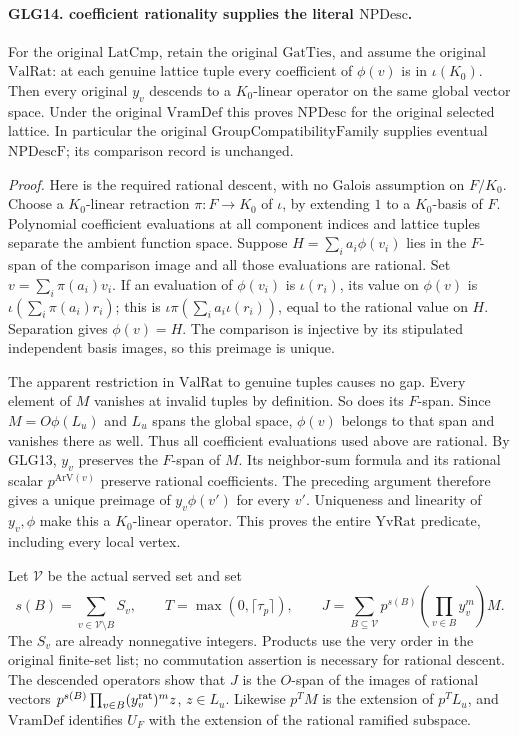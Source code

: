 \paragraph{GLG14. coefficient rationality supplies the literal \(\mathrm{NPDesc}\).}
\label{claim:GLG14}
For the original \(\mathrm{LatCmp}\), retain the original
\(\mathrm{GatTies}\), and assume the original
\(\mathrm{ValRat}\): at each genuine lattice tuple every
coefficient of \(\phi(v)\) is in \(\iota(K_0)\).
Then every original \(y_v\) descends to a \(K_0\)-linear
operator on the same global vector space. Under the
original \(\mathrm{VramDef}\) this proves
\(\mathrm{NPDesc}\) for the original selected lattice.
In particular the original
\(\mathrm{GroupCompatibilityFamily}\) supplies eventual
\(\mathrm{NPDescF}\); its comparison record is unchanged.

\emph{Proof.}
Here is the required rational descent, with no Galois
assumption on \(F/K_0\). Choose a \(K_0\)-linear retraction
\(\pi:F\to K_0\) of \(\iota\), by extending \(1\) to a
\(K_0\)-basis of \(F\). Polynomial coefficient evaluations
at all component indices and lattice tuples separate
the ambient function space. Suppose
\(H=\sum_i a_i\phi(v_i)\) lies in the \(F\)-span of the
comparison image and all those evaluations are rational.
Set \(v=\sum_i\pi(a_i)v_i\). If an evaluation of
\(\phi(v_i)\) is \(\iota(r_i)\), its value on \(\phi(v)\)
is \(\iota(\sum_i\pi(a_i)r_i)\); this is
\(\iota\pi(\sum_i a_i\iota(r_i))\), equal to the
rational value on \(H\). Separation gives \(\phi(v)=H\).
The comparison is injective by its stipulated independent
basis images, so this preimage is unique.

The apparent restriction in \(\mathrm{ValRat}\) to genuine
tuples causes no gap. Every element of \(M\) vanishes
at invalid tuples by definition. So does its \(F\)-span.
Since \(M=O\phi(L_u)\) and \(L_u\) spans the global space,
\(\phi(v)\) belongs to that span and vanishes there as well.
Thus all coefficient evaluations used above are rational.
By GLG13, \(y_v\) preserves the \(F\)-span of \(M\).
Its neighbor-sum formula and its rational scalar
\(p^{\mathrm{ArV}(v)}\) preserve rational coefficients.
The preceding argument therefore gives a unique preimage
of \(y_v\phi(v')\) for every \(v'\). Uniqueness and
linearity of \(y_v,\phi\) make this a \(K_0\)-linear
operator. This proves the entire \(\mathrm{YvRat}\)
predicate, including every local vertex.

Let \(\mathcal V\) be the actual served set and set
\[
 s(B)=\sum_{v\in\mathcal V\setminus B}S_v,\qquad
 T=\max(0,\lceil\tau_p\rceil),\qquad
 J=\sum_{B\subseteq\mathcal V}
           p^{s(B)}\left(\prod_{v\in B}y_v^m\right)M .            \tag{GLG.42}
\]
The \(S_v\) are already nonnegative integers. Products
use the very order in the original finite-set list; no
commutation assertion is necessary for rational descent.
The descended operators show that \(J\) is the
\(O\)-span of the images of rational vectors
\(p^{s(B)}\prod_{v\in B}(y_v^{\rm rat})^m z\), \(z\in L_u\).
Likewise \(p^TM\) is the extension of \(p^TL_u\), and
\(\mathrm{VramDef}\) identifies \(U_F\) with the extension
of the rational ramified subspace.

